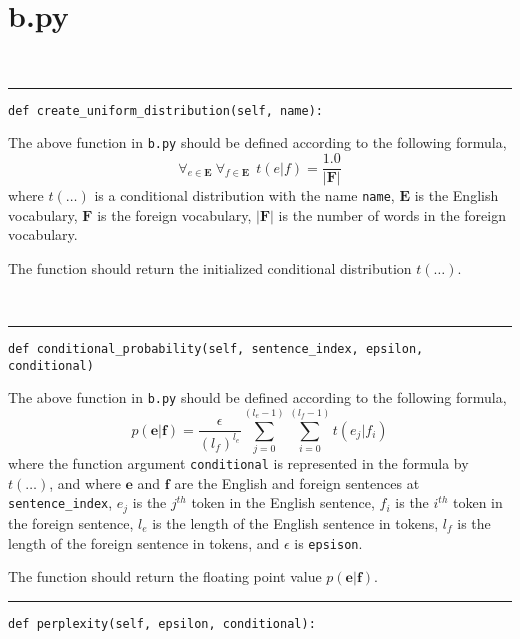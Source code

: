 \documentclass[]{article}
\begin{document}
\section*{b.py}

\ \\
\noindent\rule[0.5ex]{\linewidth}{1pt}

\begin{verbatim}
def create_uniform_distribution(self, name):
\end{verbatim}

The above function in \texttt{b.py} should be defined according to the following formula,
%
\begin{equation}
\forall_{e \in {\bm E}} \  \forall_{f \in {\bm E}} \ \ t(e | f) = \frac{1.0}{|{\bm F}|}
\end{equation}
%
where $t(\ldots)$ is a conditional distribution with the name \texttt{name}, ${\bm E}$ is the English vocabulary, ${\bm F}$ is the foreign vocabulary, $|{\bm F}|$ is the number of words in the foreign vocabulary. 

The function should return the initialized conditional distribution $t(\ldots)$.

\ \\
\noindent\rule[0.5ex]{\linewidth}{1pt}


\begin{verbatim}
def conditional_probability(self, sentence_index, epsilon, conditional)
\end{verbatim}

The above function in \texttt{b.py} should be defined according to the following formula,
%
\begin{equation}
p({\bm e}|{\bm f}) = \frac{\epsilon}{(l_f)^{l_e}} \sum_{j=0}^{(l_e - 1)} \sum_{i=0}^{(l_f - 1)} t(e_j | f_i)
\end{equation}
%
where the function argument \texttt{conditional} is represented in the formula by $t(\ldots)$, and where ${\bm e}$ and ${\bm f}$ are the English and foreign sentences at \texttt{sentence\_index}, $e_j$ is the $j^{th}$ token in the English sentence, $f_i$ is the $i^{th}$ token in the foreign sentence, $l_e$ is the length of the English sentence in tokens, $l_f$ is the length of the foreign sentence in tokens, and $\epsilon$ is \texttt{epsison}.

The function should return the floating point value $p({\bm e}|{\bm f})$.
\ \\
\noindent\rule[0.5ex]{\linewidth}{1pt}


\begin{verbatim}
def perplexity(self, epsilon, conditional):
\end{verbatim}
\end{document}
